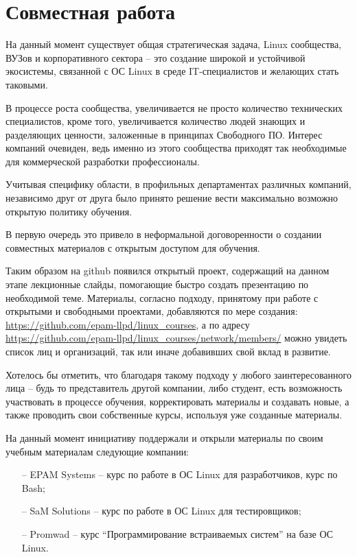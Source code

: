 \section{Совместная работа}

На данный момент существует общая стратегическая задача, Linux сообщества, ВУЗов и корпоративного сектора -- это 
создание широкой и устойчивой экосистемы,  связанной с ОС Linux в среде IT-специалистов и желающих стать таковыми.

В процессе роста сообщества,  увеличивается не просто количество технических специалистов,  кроме того,  
увеличивается количество людей знающих и разделяющих ценности,  заложенные в принципах Свободного ПО.
Интерес компаний очевиден,  ведь именно из этого сообщества приходят так необходимые для коммерческой разработки профессионалы.

Учитывая специфику области, в профильных департаментах различных компаний, независимо друг от друга было принято 
решение вести максимально возможно открытую политику обучения.

В первую очередь это привело в неформальной договоренности о создании совместных материалов с открытым доступом 
для обучения.

Таким образом на github появился открытый проект, содержащий на данном этапе лекционные слайды, помогающие быстро создать
презентацию по необходимой теме. Материалы, согласно подходу, принятому при работе с открытыми и свободными проектами, 
добавляются по мере создания: \url{https://github.com/epam-llpd/linux_courses}, а по адресу \url{https://github.com/epam-llpd/linux_courses/network/members/} можно увидеть список лиц и организаций, так или иначе добавивших свой вклад в развитие.

Хотелось бы отметить,  что благодаря такому подходу у любого заинтересованного лица -- будь то представитель другой
компании,  либо студент,  есть возможность участвовать в процессе обучения,  корректировать материалы и создавать новые,
а также проводить свои собственные курсы,  используя уже созданные материалы.

На данный момент инициативу поддержали и открыли материалы по своим учебным материалам следующие компании:
\begin{itemize}
	\item[--] EPAM Systems -- курс по работе в ОС Linux для разработчиков, курс по Bash;
	\item[--] SaM Solutions -- курс по работе в ОС Linux для тестировщиков;
	\item[--] Promwad -- курс ``Программирование встраиваемых систем'' на базе ОС Linux.
\end{itemize}


